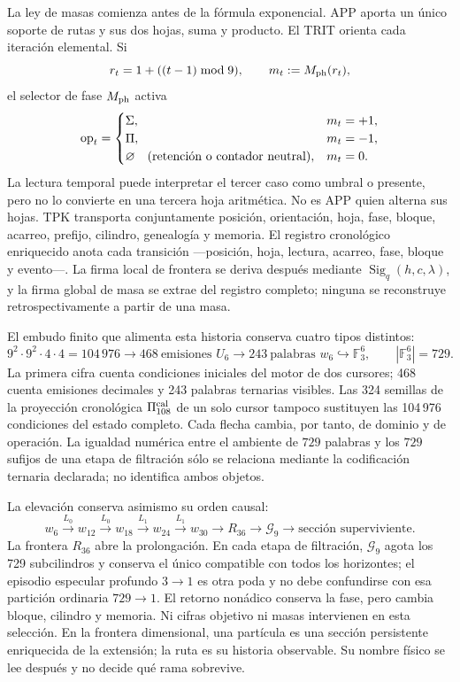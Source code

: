 La ley de masas comienza antes de la fórmula exponencial. APP aporta un único
soporte de rutas y sus dos hojas, suma y producto. El TRIT orienta cada
iteración elemental.
Si
\[
 r_t=1+((t-1)\bmod9),\qquad m_t:=M_{\rm ph}(r_t),
\]
el selector de fase \(M_{\rm ph}\) activa
\[
 \operatorname{op}_t=
 \begin{cases}
  \Sigma,&m_t=+1,\\
  \Pi,&m_t=-1,\\
  \varnothing\quad(\text{\rm retención o contador neutral}),&m_t=0.
 \end{cases}
\]
La lectura temporal puede interpretar el tercer caso como umbral o presente,
pero no lo convierte en una tercera hoja aritmética. No es APP quien alterna
sus hojas. TPK transporta
conjuntamente posición, orientación, hoja, fase, bloque, acarreo, prefijo,
cilindro, genealogía y memoria. El registro cronológico enriquecido anota
cada transición ---posición,
hoja, lectura, acarreo, fase, bloque y evento---. La firma local de frontera
se deriva después mediante \(\operatorname{Sig}_q(h,c,\lambda)\), y la firma
global de masa se extrae del registro completo; ninguna se reconstruye
retrospectivamente a partir de una masa.

El embudo finito que alimenta esta historia conserva cuatro tipos distintos:
\[
 9^2\!\cdot9^2\!\cdot4\!\cdot4=104\,976
 \longrightarrow 468\ \text{emisiones }U_6
 \longrightarrow 243\ \text{palabras }w_6
 \hookrightarrow \mathbb F_3^6,
 \qquad |\mathbb F_3^6|=729.
\]
La primera cifra cuenta condiciones iniciales del motor de dos cursores; 468
cuenta emisiones decimales y 243 palabras ternarias visibles. Las 324 semillas
de la proyección cronológica \(\Pi_{108}^{\rm cal}\) de un solo cursor
tampoco sustituyen las 104\,976
condiciones del estado completo. Cada flecha cambia, por tanto, de dominio y de
operación. La igualdad numérica entre el ambiente de \(729\) palabras y los
\(729\) sufijos de una etapa de filtración sólo se relaciona mediante la codificación
ternaria declarada; no identifica ambos objetos.

La elevación conserva asimismo su orden causal:
\[
 w_6\xrightarrow{\,L_0\,}w_{12}
 \xrightarrow{\,L_0\,}w_{18}
 \xrightarrow{\,L_1\,}w_{24}
 \xrightarrow{\,L_1\,}w_{30}
 \longrightarrow R_{36}\longrightarrow\mathcal G_9
 \longrightarrow
 \text{sección superviviente}.
\]
La frontera \(R_{36}\) abre la prolongación. En cada etapa de filtración,
\(\mathcal G_9\) agota
los 729 subcilindros y conserva el único compatible con todos los horizontes; el
episodio especular profundo \(3\to1\) es otra poda y no debe confundirse con
esa partición ordinaria \(729\to1\). El retorno nonádico conserva la fase,
pero cambia bloque, cilindro y memoria. Ni cifras objetivo ni masas intervienen
en esta selección. En la frontera dimensional, una partícula es una sección
persistente enriquecida de la extensión; la ruta es su historia observable.
Su nombre físico se lee después y no decide qué rama sobrevive.

